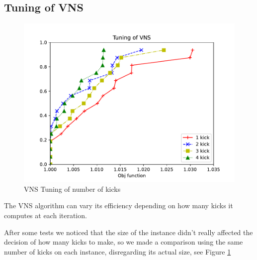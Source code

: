 \subsection{Tuning of VNS}

\begin{figure}[!h]
    \centering
    \includegraphics[width=\textwidth]{images/vns.pdf}
    \caption{VNS Tuning of number of kicks}
    \label{fig:vns}
\end{figure}

The VNS algorithm can vary its efficiency depending on how many kicks it computes at each iteration.

After some tests we noticed that the size of the instance didn't really affected the decision of how many kicks to make, so we made a comparison using the same number of kicks on each instance, disregarding its actual size, see Figure \ref{fig:vns}

